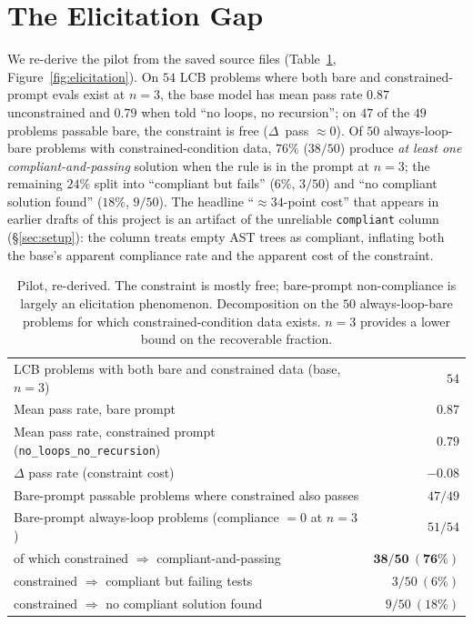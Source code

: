 \documentclass[11pt]{article}
\newcommand{\nlnr}{\texttt{no\_loops\_no\_recursion}}
\begin{document}
\section{The Elicitation Gap}
\label{sec:elicitation}

We re-derive the pilot from the saved source files (Table~\ref{tab:elicitation}, Figure~\ref{fig:elicitation}). On $54$ LCB problems where both bare and constrained-prompt evals exist at $n=3$, the base model has mean pass rate $0.87$ unconstrained and $0.79$ when told ``no loops, no recursion''; on $47$ of the $49$ problems passable bare, the constraint is free ($\Delta$~pass $\approx 0$). Of $50$ always-loop-bare problems with constrained-condition data, $76\%$ ($38/50$) produce \emph{at least one compliant-and-passing} solution when the rule is in the prompt at $n=3$; the remaining $24\%$ split into ``compliant but fails'' ($6\%$, $3/50$) and ``no compliant solution found'' ($18\%$, $9/50$). The headline ``$\approx 34$-point cost'' that appears in earlier drafts of this project is an artifact of the unreliable \texttt{compliant} column (\S\ref{sec:setup}): the column treats empty AST trees as compliant, inflating both the base's apparent compliance rate and the apparent cost of the constraint.

\begin{table}[h]
\centering
\small
\begin{tabular}{lr}
\toprule
LCB problems with both bare and constrained data (base, $n=3$) & $54$ \\
Mean pass rate, bare prompt & $0.87$ \\
Mean pass rate, constrained prompt (\nlnr) & $0.79$ \\
$\Delta$ pass rate (constraint cost) & $\mathbf{-0.08}$ \\
Bare-prompt passable problems where constrained also passes & $47/49$ \\
\midrule
Bare-prompt always-loop problems (compliance $= 0$ at $n=3$) & $51/54$ \\
\quad of which constrained $\Rightarrow$ compliant-and-passing & $\mathbf{38/50}~(\mathbf{76\%})$ \\
\quad constrained $\Rightarrow$ compliant but failing tests & $3/50~(6\%)$ \\
\quad constrained $\Rightarrow$ no compliant solution found & $9/50~(18\%)$ \\
\bottomrule
\end{tabular}
\caption{Pilot, re-derived. The constraint is mostly free; bare-prompt non-compliance is largely an elicitation phenomenon. Decomposition on the $50$ always-loop-bare problems for which constrained-condition data exists. $n=3$ provides a lower bound on the recoverable fraction.}
\label{tab:elicitation}
\end{table}
\end{document}
